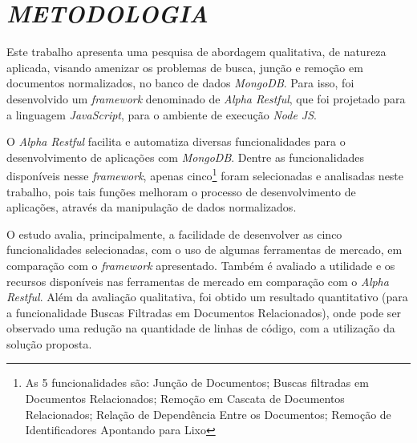 \chapter{\textit{METODOLOGIA}}
\label{Metodologia}

Este trabalho apresenta uma pesquisa de abordagem qualitativa, de natureza aplicada, visando amenizar os problemas de busca, junção e remoção em documentos normalizados, no banco de dados \textit{MongoDB}. Para isso, foi desenvolvido um \textit{framework} denominado de \textit{Alpha Restful}, que foi projetado para a linguagem \textit{JavaScript}, para o ambiente de execução \textit{Node JS}.


O \textit{Alpha Restful} facilita e automatiza diversas funcionalidades para o desenvolvimento de aplicações com \textit{MongoDB}. Dentre as funcionalidades disponíveis nesse \textit{framework}, apenas cinco\footnote{As 5 funcionalidades são: Junção de Documentos; Buscas filtradas em Documentos Relacionados; Remoção em Cascata de Documentos Relacionados; Relação de Dependência Entre os Documentos; Remoção de Identificadores Apontando para Lixo} foram selecionadas e analisadas neste trabalho, pois tais funções melhoram o processo de desenvolvimento de aplicações, através da manipulação de dados normalizados.

O estudo avalia, principalmente, a facilidade de desenvolver as cinco funcionalidades selecionadas, com o uso de algumas ferramentas de mercado, em comparação com o \textit{framework} apresentado. Também é avaliado a utilidade e os recursos disponíveis nas ferramentas de mercado em comparação com o \textit{Alpha Restful}. Além da avaliação qualitativa, foi obtido um resultado quantitativo (para a funcionalidade Buscas Filtradas em Documentos Relacionados), onde pode ser observado uma redução na quantidade de linhas de código, com a utilização da solução proposta.

